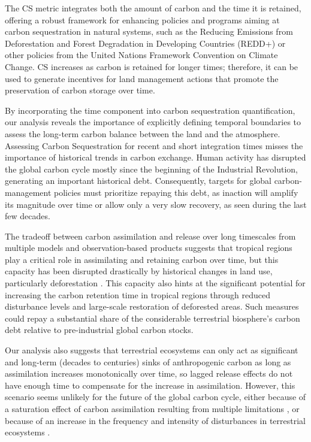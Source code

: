 \documentclass[ProofPDF]{./Styles/Jnls-Template-V3}
\begin{document}
The CS metric integrates both the amount of carbon and the time it is retained, offering a robust framework for enhancing policies and programs aiming at carbon sequestration in natural systems, such as the Reducing Emissions from Deforestation and Forest Degradation in Developing Countries (REDD+) or other policies from the United Nations Framework Convention on Climate Change. CS increases as carbon is retained for longer times; therefore, it can be used to generate incentives for land management actions that promote the preservation of carbon storage over time. 

By incorporating the time component into carbon sequestration quantification, our analysis reveals the importance of explicitly defining temporal boundaries to assess the long-term carbon balance between the land and the atmosphere. Assessing Carbon Sequestration for recent and short integration times misses the importance of historical trends in carbon exchange. Human activity has disrupted the global carbon cycle mostly since the beginning of the Industrial Revolution, generating an important historical debt. Consequently, targets for global carbon-management policies must prioritize repaying this debt, as inaction will amplify its magnitude over time or allow only a very slow recovery, as seen during the last few decades.

The tradeoff between carbon assimilation and release over long timescales from multiple models and observation-based products suggests that tropical regions play a critical role in assimilating and retaining carbon over time, but this capacity has been disrupted drastically by historical changes in land use, particularly deforestation \citep{Li2022}. This capacity also hints at the significant potential for increasing the carbon retention time in tropical regions through reduced disturbance levels and large-scale restoration of deforested areas. Such measures could repay a substantial share of the considerable terrestrial biosphere's carbon debt relative to pre-industrial global carbon stocks.

Our analysis also suggests that terrestrial ecosystems can only act as significant and long-term (decades to centuries) sinks of anthropogenic carbon as long as assimilation increases monotonically over time, so lagged release effects do not have enough time to compensate for the increase in assimilation. However, this scenario seems unlikely for the future of the global carbon cycle, either because of a saturation effect of carbon assimilation resulting from multiple limitations \citep{Melnikova2021,Friedlingstein2023}, or because of an increase in the frequency and intensity of disturbances in terrestrial ecosystems \citep{Xu2021,Sitch2024}.
\end{document}

